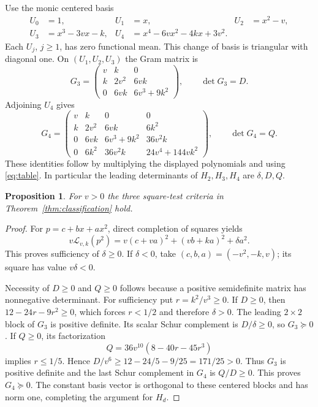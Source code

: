 \documentclass[11pt]{article}
\newtheorem{proposition}[theorem]{Proposition}
\newcommand{\Lk}{\mathcal L_{v,k}}
\begin{document}
Use the monic centered basis
\begin{align*}
 U_0&=1,& U_1&=x,& U_2&=x^2-v,\\
 U_3&=x^3-3vx-k,&
 U_4&=x^4-6vx^2-4kx+3v^2.
\end{align*}
Each $U_j$, $j\geq1$, has zero functional mean. This
change of basis is triangular with diagonal one. On
$(U_1,U_2,U_3)$ the Gram matrix is
\begin{equation}\label{eq:G3}
 G_3=\begin{pmatrix}
 v&k&0\\ k&2v^2&6vk\\0&6vk&6v^3+9k^2
 \end{pmatrix},\qquad \det G_3=D.
\end{equation}
Adjoining $U_4$ gives
\begin{equation}\label{eq:G4}
 G_4=\begin{pmatrix}
 v&k&0&0\\
 k&2v^2&6vk&6k^2\\
 0&6vk&6v^3+9k^2&36v^2k\\
 0&6k^2&36v^2k&24v^4+144vk^2
 \end{pmatrix},\qquad \det G_4=Q.
\end{equation}
These identities follow by multiplying the displayed
polynomials and using \eqref{eq:table}. In particular the
leading determinants of $H_2,H_3,H_4$ are $\delta,D,Q$.

\begin{proposition}\label{prop:positivity}
For $v>0$ the three square-test criteria in
Theorem~\ref{thm:classification} hold.
\end{proposition}
\begin{proof}
For $p=c+bx+ax^2$, direct completion of squares yields
\[
 v\Lk(p^2)=v(c+va)^2+(vb+ka)^2+\delta a^2.
\]
This proves sufficiency of $\delta\geq0$.
If $\delta<0$, take $(c,b,a)=(-v^2,-k,v)$; its square
has value $v\delta<0$.

Necessity of $D\geq0$ and $Q\geq0$ follows because a
positive semidefinite matrix has nonnegative determinant.
For sufficiency put $r=k^2/v^3\geq0$. If $D\geq0$,
then $12-24r-9r^2\geq0$, which forces $r<1/2$ and
therefore $\delta>0$. The leading $2\times2$ block of
$G_3$ is positive definite. Its scalar Schur complement
is $D/\delta\geq0$, so $G_3\succeq0$.
If $Q\geq0$, its factorization
\begin{equation}\label{eq:normalize}
 Q=36v^{10}(8-40r-45r^3)
\end{equation}
implies $r\leq1/5$. Hence
$D/v^6\geq12-24/5-9/25=171/25>0$.
Thus $G_3$ is positive definite and the last Schur
complement in $G_4$ is $Q/D\geq0$. This proves
$G_4\succeq0$. The constant basis vector is orthogonal
to these centered blocks and has norm one, completing
the argument for $H_d$.
\end{proof}
\end{document}
